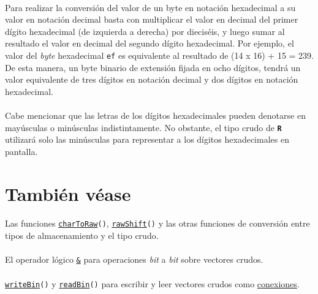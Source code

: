 \documentclass{article}[letter, 12pt]
\def\code#1{\texttt{#1}}
\def\codename#1{\textbf{\texttt{\color{gray}#1}}}
\begin{document}
\paragraph{}Para realizar la conversión del valor de un byte en notación hexadecimal a su valor en notación decimal basta con multiplicar el valor en decimal del primer dígito hexadecimal (de izquierda a derecha) por dieciséis, y luego sumar al resultado el valor en decimal del segundo dígito hexadecimal. Por ejemplo, el valor del \textit{byte} hexadecimal \code{ef} es equivalente al resultado de (14 x 16) + 15 = 239. De esta manera, un byte binario de extensión fijada en ocho dígitos, tendrá un valor equivalente de tres dígitos en notación decimal y dos dígitos en notación hexadecimal.\par

\paragraph{}Cabe mencionar que las letras de los dígitos hexadecimales pueden denotarse en mayúsculas o minúsculas indistintamente. No obstante, el tipo crudo de \codename{R} utilizará solo las minúsculas para representar a los dígitos hexadecimales en pantalla.\par

\section{\color{gray}También véase}
\paragraph{}Las funciones \code{\href{run:/typeof.pdf}{charToRaw}()}, \code{\href{run:/typeof.pdf}{rawShift}()} y las otras funciones de conversión entre tipos de almacenamiento y el tipo crudo.\par
\paragraph{}El operador lógico \code{\href{run:/typeof.pdf}{\&}} para operaciones \textit{bit} a \textit{bit} sobre vectores crudos.\par
\paragraph{}\code{\href{run:/typeof.pdf}{writeBin}()} y \code{\href{run:/typeof.pdf}{readBin}()} para escribir y leer vectores crudos como \href{run:/typeof.pdf}{conexiones}.\par
\end{document}
